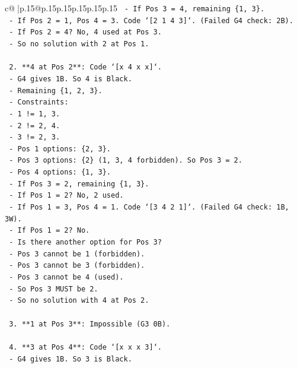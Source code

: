 \documentclass{article}
\begin{document}
{\begin{supertabular}{c@{$\;$}|p{.15\linewidth}@{}p{.15\linewidth}p{.15\linewidth}p{.15\linewidth}p{.15\linewidth}p{.15\linewidth}}
{{{\texttt{       {-} If Pos 3 = 4, remaining \{1, 3\}.} \\
\texttt{       {-} If Pos 2 = 1, Pos 4 = 3. Code `{[}2 1 4 3{]}`. (Failed G4 check: 2B).} \\
\texttt{       {-} If Pos 2 = 4? No, 4 used at Pos 3.} \\
\texttt{       {-} So no solution with 2 at Pos 1.} \\
\\ 
\texttt{    2. **4 at Pos 2**: Code `{[}x 4 x x{]}`.} \\
\texttt{       {-} G4 gives 1B. So 4 is Black.} \\
\texttt{       {-} Remaining \{1, 2, 3\}.} \\
\texttt{       {-} Constraints:} \\
\texttt{         {-} 1 != 1, 3.} \\
\texttt{         {-} 2 != 2, 4.} \\
\texttt{         {-} 3 != 2, 3.} \\
\texttt{       {-} Pos 1 options: \{2, 3\}.} \\
\texttt{       {-} Pos 3 options: \{2\} (1, 3, 4 forbidden). So Pos 3 = 2.} \\
\texttt{       {-} Pos 4 options: \{1, 3\}.} \\
\texttt{       {-} If Pos 3 = 2, remaining \{1, 3\}.} \\
\texttt{       {-} If Pos 1 = 2? No, 2 used.} \\
\texttt{       {-} If Pos 1 = 3, Pos 4 = 1. Code `{[}3 4 2 1{]}`. (Failed G4 check: 1B, 3W).} \\
\texttt{       {-} If Pos 1 = 2? No.} \\
\texttt{       {-} Is there another option for Pos 3?} \\
\texttt{         {-} Pos 3 cannot be 1 (forbidden).} \\
\texttt{         {-} Pos 3 cannot be 3 (forbidden).} \\
\texttt{         {-} Pos 3 cannot be 4 (used).} \\
\texttt{         {-} So Pos 3 MUST be 2.} \\
\texttt{       {-} So no solution with 4 at Pos 2.} \\
\\ 
\texttt{    3. **1 at Pos 3**: Impossible (G3 0B).} \\
\\ 
\texttt{    4. **3 at Pos 4**: Code `{[}x x x 3{]}`.} \\
\texttt{       {-} G4 gives 1B. So 3 is Black.} \\
}}}
\end{supertabular}}
\end{document}
